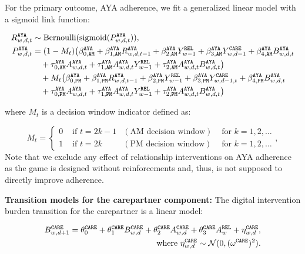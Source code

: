 For the primary outcome, AYA adherence, we fit a generalized linear model with a sigmoid link function: 


\begin{align}
R_{w,d,t}^{\tiny\texttt{AYA}} &\sim \text{Bernoulli}(\text{sigmoid}(P_{w,d,t}^{\tiny\texttt{AYA}})), \nonumber \\
P_{w,d,t}^{\tiny\texttt{AYA}} &= (1-M_t)\big(\beta_{0, {\texttt{AM}}}^{\tiny\texttt{AYA}} + \beta^{\tiny\texttt{AYA}}_{1, {\texttt{AM}}} R_{w,d,t-1}^{\tiny\texttt{AYA}} 
+ \beta_{2,{\texttt{AM}}}^{\tiny\texttt{AYA}} Y_{w-1}^{\tiny\texttt{REL}} 
+ \beta_{3,{\texttt{AM}}}^{\tiny\texttt{AYA}} Y_{w,d-1}^{\tiny\texttt{CARE}} + \beta_{4, {\texttt{AM}}}^{\tiny\texttt{AYA}} B_{w,d,t}^{\tiny\texttt{AYA}} \nonumber \\
&\quad + \tau_{0, {\texttt{AM}}}^{\tiny\texttt{AYA}} A_{w,d,t}^{\tiny\texttt{AYA}} 
+ \tau_{1, {\texttt{AM}}}^{\tiny\texttt{AYA}} A_{w,d,t}^{\tiny\texttt{AYA}} Y_{w-1}^{\tiny\texttt{REL}} 
+ \tau_{2, {\texttt{AM}}}^{\tiny\texttt{AYA}} A_{w,d,t}^{\tiny\texttt{AYA}} B_{w,d,t}^{\tiny\texttt{AYA}}\big) \nonumber \\
&\quad + M_t\big(\beta_{0, {\texttt{PM}}}^{\tiny\texttt{AYA}} + \beta^{\tiny\texttt{AYA}}_{1, {\texttt{PM}}} R_{w,d,t-1}^{\tiny\texttt{AYA}} 
+ \beta_{2,{\texttt{PM}}}^{\tiny\texttt{AYA}} Y_{w-1}^{\tiny\texttt{REL}} 
+ \beta_{3,{\texttt{PM}}}^{\tiny\texttt{AYA}} Y_{w,d-1,t}^{\tiny\texttt{CARE}} + \beta_{4, {\texttt{PM}}}^{\tiny\texttt{AYA}} B_{w,d,t}^{\tiny\texttt{AYA}} \nonumber \\
&\quad + \tau_{0, {\texttt{PM}}}^{\tiny\texttt{AYA}} A_{w,d,t}^{\tiny\texttt{AYA}}  
+ \tau_{1, {\texttt{PM}}}^{\tiny\texttt{AYA}} A_{w,d,t}^{\tiny\texttt{AYA}} Y_{w-1}^{\tiny\texttt{REL}} 
+ \tau_{2, {\texttt{PM}}}^{\tiny\texttt{AYA}} A_{w,d,t}^{\tiny\texttt{AYA}} B_{w,d,t}^{\tiny\texttt{AYA}}\big)
\label{equ:R_Transition_AYA}
\end{align}

where $M_t$ is a decision window indicator defined as:

$$
    M_t = \left\{
    \begin{array}{clll}
         0 & \text{ if } t = 2k - 1 & (\text{AM decision window}) & \text{ for } k = 1, 2, \dots  \\
         1 & \text{ if } t = 2k & (\text{PM decision window}) &\text{ for } k = 1, 2, \dots
    \end{array},\right.
$$ 
Note that we exclude any effect of relationship interventions on AYA adherence as the game is designed without reinforcements and, thus, is not supposed to directly improve adherence.



\textbf{Transition models for the carepartner component: } The digital intervention burden transition for the carepartner is a linear model:

\begin{align}
\label{equ:B_transition_care}
    B_{w,d+1}^{\tiny\texttt{CARE}} = \theta^{\tiny\texttt{CARE}}_{0} + \theta_{1}^{\tiny\texttt{CARE}} B_{w,d}^{\tiny\texttt{CARE}} + \theta_{2}^{\tiny\texttt{CARE}} A_{w,d}^{\tiny\texttt{CARE}} + \theta_{3}^{\tiny\texttt{CARE}} A_{w}^{\tiny\texttt{REL}} + \eta_{w,d}^{\tiny\texttt{CARE}}, \nonumber\\
    \text{ where $\eta_{w,d}^{\tiny\texttt{CARE}} \sim \mathcal{N}(0, (\omega^{\tiny\texttt{CARE}})^2)$.}
\end{align}

